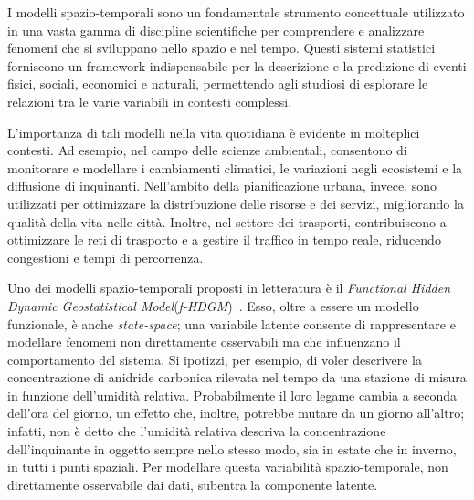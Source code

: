 
I modelli spazio-temporali sono un fondamentale strumento concettuale utilizzato in una vasta gamma di discipline scientifiche per comprendere e analizzare fenomeni che si sviluppano nello spazio e nel tempo. Questi sistemi statistici forniscono un framework indispensabile per la descrizione e la predizione di eventi fisici, sociali, economici e naturali, permettendo agli studiosi di esplorare le relazioni tra le varie variabili in contesti complessi.
\par L'importanza di tali modelli nella vita quotidiana è evidente in molteplici contesti. Ad esempio, nel campo delle scienze ambientali, consentono di monitorare e modellare i cambiamenti climatici, le variazioni negli ecosistemi e la diffusione di inquinanti. Nell'ambito della pianificazione urbana, invece, sono utilizzati per ottimizzare la distribuzione delle risorse e dei servizi, migliorando la qualità della vita nelle città. Inoltre, nel settore dei trasporti, contribuiscono a ottimizzare le reti di trasporto e a gestire il traffico in tempo reale, riducendo congestioni e tempi di percorrenza.
\par Uno dei modelli spazio-temporali proposti in letteratura è il \textit{Functional Hidden Dynamic Geostatistical Model}(\textit{f-HDGM})~\citep{paper_f_HDGM}. Esso, oltre a essere un modello funzionale, è anche \textit{state-space}; una variabile latente consente di rappresentare e modellare fenomeni non direttamente osservabili ma che influenzano il comportamento del sistema. Si ipotizzi, per esempio, di voler descrivere la concentrazione di anidride carbonica rilevata nel tempo da una stazione di misura in funzione dell'umidità relativa. Probabilmente il loro legame cambia a seconda dell'ora del giorno, un effetto che, inoltre, potrebbe mutare da un giorno all'altro; infatti, non è detto che l'umidità relativa descriva la concentrazione dell'inquinante in oggetto sempre nello stesso modo, sia in estate che in inverno, in tutti i punti spaziali. Per modellare questa variabilità spazio-temporale, non direttamente osservabile dai dati, subentra la componente latente.
